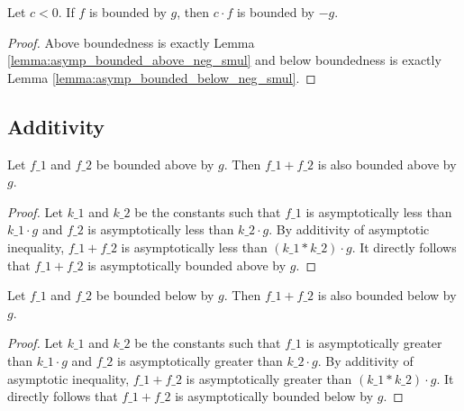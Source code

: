 \begin{theorem}
    \label{thm:asymp_bounded_neg_smul}
    \leanok
    Let $c < 0$. If $f$ is bounded by $g$, then $c \cdot f$ is bounded by $-g$.
\end{theorem}

\begin{proof}
    \leanok
    Above boundedness is exactly Lemma \ref{lemma:asymp_bounded_above_neg_smul} and
    below boundedness is exactly Lemma \ref{lemma:asymp_bounded_below_neg_smul}.
\end{proof}


\subsection{Additivity}

\begin{lemma}
    \label{lemma:asymp_bounded_above_add}
    \leanok
    Let $f\_1$ and $f\_2$ be bounded above by $g$. Then $f\_1 + f\_2$ is also bounded 
    above by $g$.
\end{lemma}

\begin{proof}
    \leanok
    Let $k\_1$ and $k\_2$ be the constants such that $f\_1$ is asymptotically less than $k\_1 \cdot g$ 
    and $f\_2$ is asymptotically less than $k\_2 \cdot g$. By additivity of asymptotic
    inequality, $f\_1 + f\_2$ is asymptotically less than $(k\_1 * k\_2) \cdot g$.
    It directly follows that $f\_1 + f\_2$ is asymptotically bounded above by $g$.
\end{proof}

\begin{lemma}
    \label{lemma:asymp_bounded_below_add}
    \leanok
    Let $f\_1$ and $f\_2$ be bounded below by $g$. Then $f\_1 + f\_2$ is also bounded 
    below by $g$.
\end{lemma}

\begin{proof}
    \leanok
    Let $k\_1$ and $k\_2$ be the constants such that $f\_1$ is asymptotically greater than $k\_1 \cdot g$ 
    and $f\_2$ is asymptotically greater than $k\_2 \cdot g$. By additivity of asymptotic
    inequality, $f\_1 + f\_2$ is asymptotically greater than $(k\_1 * k\_2) \cdot g$.
    It directly follows that $f\_1 + f\_2$ is asymptotically bounded below by $g$.
\end{proof}

